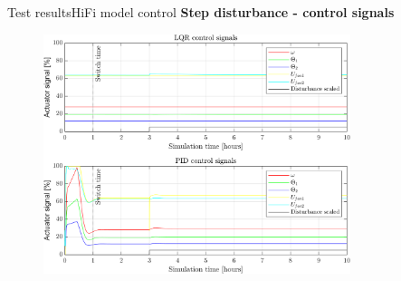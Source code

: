 \begin{frame}{Test results}{HiFi model control}
	\textbf{Step disturbance - control signals}
	\begin{figure}[H]
		\centering
		\includegraphics[width=0.8\textwidth]{../Graphics/fig_inputs_stepDist.png}
	\end{figure}
\end{frame}




